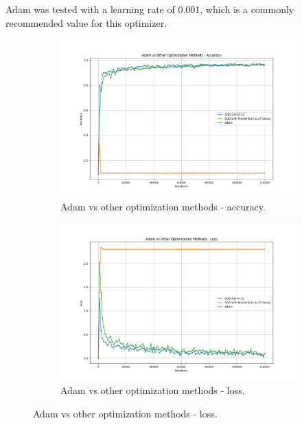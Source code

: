 \documentclass{article}
\begin{document}
Adam was tested with a learning rate of 0.001, which is a commonly recommended value 
for this optimizer.

\begin{figure}[H]
    \centering
    \begin{subfigure}[t]{0.48\textwidth}
        \vspace{0pt}%
        \centering
        \includegraphics[width=1.1\textwidth]{plots/part3_adam_accuracy.png}
        \caption{Adam vs other optimization methods - accuracy.}
        \label{fig:adam_accuracy}
    \end{subfigure}
    \hfill
    \begin{subfigure}[t]{0.48\textwidth}
        \vspace{0pt}%
        \centering
        \includegraphics[width=1.1\textwidth]{plots/part3_adam_loss.png}
        \caption{Adam vs other optimization methods - loss.}
        \label{fig:adam_loss}
    \end{subfigure}
\end{figure}
\end{document}
